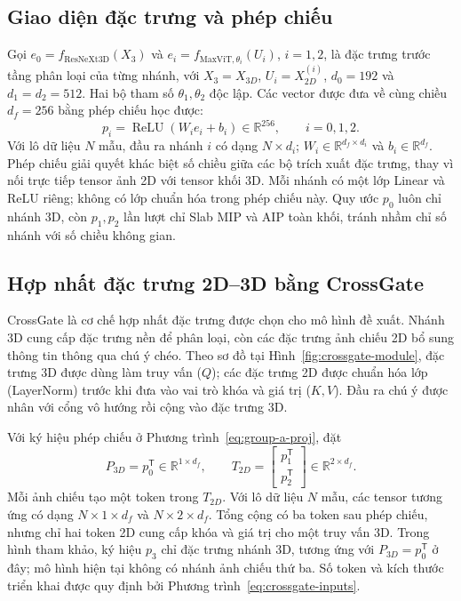 \documentclass[14pt,a4paper,oneside]{extreport}
\begin{document}
\subsection{Giao diện đặc trưng và phép chiếu}
\label{sec:branch-backbones}
Gọi $e_0=f_{\mathrm{ResNeXt3D}}(X_3)$ và
$e_i=f_{\mathrm{MaxViT},\theta_i}(U_i)$, $i=1,2$, là đặc trưng
trước tầng phân loại của từng nhánh, với $X_3=X_{3D}$,
$U_i=X_{2D}^{(i)}$, $d_0=192$ và $d_1=d_2=512$.
Hai bộ tham số $\theta_1,\theta_2$ độc lập. Các vector
được đưa về cùng chiều $d_f=256$ bằng phép chiếu học được:
\begin{equation}
 p_i=\operatorname{ReLU}(W_i e_i+b_i)\in\mathbb R^{256},\qquad i=0,1,2.
 \label{eq:group-a-proj}
\end{equation}
Với lô dữ liệu $N$ mẫu, đầu ra nhánh $i$ có dạng $N\times d_i$;
$W_i\in\mathbb R^{d_f\times d_i}$ và $b_i\in\mathbb R^{d_f}$.
Phép chiếu giải quyết khác biệt số chiều giữa các bộ trích xuất đặc trưng,
thay vì nối trực tiếp tensor ảnh 2D với tensor khối 3D. Mỗi nhánh có
một lớp Linear và ReLU riêng; không có lớp chuẩn hóa trong phép chiếu này.
Quy ước $p_0$ luôn chỉ nhánh 3D, còn $p_1,p_2$ lần lượt chỉ Slab MIP
và AIP toàn khối, tránh nhầm chỉ số nhánh với số chiều không gian.

\subsection{Hợp nhất đặc trưng 2D--3D bằng CrossGate}
\label{sec:crossgate-fusion}
CrossGate là cơ chế hợp nhất đặc trưng được chọn cho mô hình đề xuất. Nhánh
3D cung cấp đặc trưng nền để phân loại, còn các đặc trưng ảnh chiếu
2D bổ sung thông tin thông qua chú ý chéo. Theo sơ đồ tại
Hình~\ref{fig:crossgate-module}, đặc trưng 3D được dùng làm truy vấn
($Q$); các đặc trưng 2D được chuẩn hóa lớp (LayerNorm) trước khi
đưa vào vai trò khóa và giá trị ($K,V$). Đầu ra chú ý được nhân
với cổng vô hướng rồi cộng vào đặc trưng 3D.

Với ký hiệu phép chiếu ở Phương trình~\eqref{eq:group-a-proj}, đặt
\begin{equation}
 P_{3D}=p_0^{\mathsf T}\in\mathbb R^{1\times d_f},\qquad
 T_{2D}=\begin{bmatrix}p_1^{\mathsf T}\\p_2^{\mathsf T}\end{bmatrix}
 \in\mathbb R^{2\times d_f}.
 \label{eq:crossgate-inputs}
\end{equation}
Mỗi ảnh chiếu tạo một token trong $T_{2D}$. Với lô dữ liệu $N$ mẫu,
các tensor tương ứng có dạng $N\times1\times d_f$ và
$N\times2\times d_f$. Tổng cộng có ba token sau phép chiếu, nhưng chỉ
hai token 2D cung cấp khóa và giá trị cho một truy vấn 3D.
Trong hình tham khảo, ký hiệu $p_3$ chỉ đặc trưng nhánh 3D,
tương ứng với $P_{3D}=p_0^{\mathsf T}$ ở đây; mô hình hiện tại không
có nhánh ảnh chiếu thứ ba. Số token và kích thước triển khai được
quy định bởi Phương trình~\eqref{eq:crossgate-inputs}.
\end{document}
